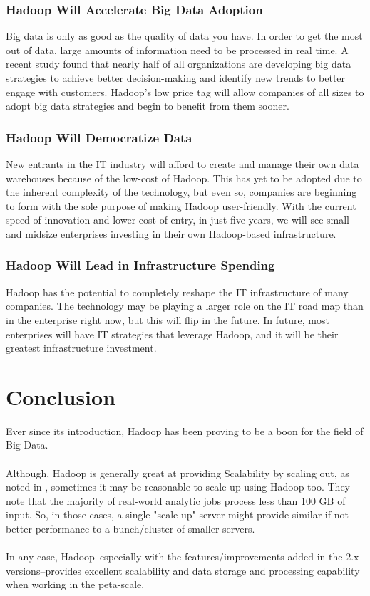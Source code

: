 \documentclass[a4paper,12pt,oneside]{report}
\begin{document}
\subsubsection{Hadoop Will Accelerate Big Data Adoption}
Big data is only as good as the quality of data you have. In order to get the most out of data, large amounts of information need to be processed in real time. A recent study found that nearly half of all organizations are developing big data strategies to achieve better decision-making and identify new trends to better engage with customers. Hadoop's low price tag will allow companies of all sizes to adopt big data strategies and begin to benefit from them sooner.

\subsubsection{Hadoop Will Democratize Data}
New entrants in the IT industry will afford to create and manage their own data warehouses because of the low-cost of Hadoop. This has yet to be adopted due to the inherent complexity of the technology, but even so, companies are beginning to form with the sole purpose of making Hadoop user-friendly. With the current speed of innovation and lower cost of entry, in just five years, we will see small and midsize enterprises investing in their own Hadoop-based infrastructure.

\subsubsection{Hadoop Will Lead in Infrastructure Spending}
Hadoop has the potential to completely reshape the IT infrastructure of many companies. The technology may be playing a larger role on the IT road map than in the enterprise right now, but this will flip in the future. In future, most enterprises will have IT strategies that leverage Hadoop, and it will be their greatest infrastructure investment.

\section{Conclusion}
Ever since its introduction, Hadoop has been proving to be a boon for the field of Big Data.\\ 
\\
Although, Hadoop is generally great at providing Scalability by scaling out, as noted in \cite{Appuswamy2013}, sometimes it may be 
reasonable to scale up using Hadoop too. They note that the majority of real-world analytic jobs process less than 100 GB of input. 
So, in those cases, a single "scale-up" server might provide similar if not better performance to a bunch/cluster of smaller servers.\\
\\
In any case, Hadoop--especially with the features/improvements added in the 2.x versions--provides excellent scalability and data storage and processing
capability when working in the peta-scale.
\end{document}
